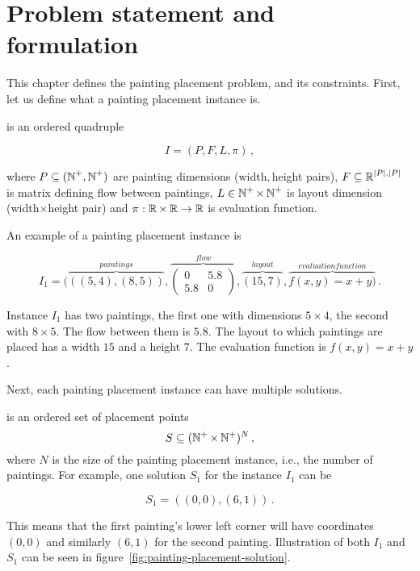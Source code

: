 \chapter{Problem statement and formulation}\label{ch:problem-statement-and-formulation}

This chapter defines the painting placement problem, and its constraints.
First, let us define what a painting placement instance is.

 is an ordered quadruple

\begin{equation}
    I = (P, F, L, \pi)\,,
    \label{eq:painting-placement-instance}
\end{equation}

where $P \subseteq (\operatorname*{\mathbb{N}}^+, \operatorname*{\mathbb{N}}^+)$ are painting dimensions (width$, $height pairs),
$F \subseteq \operatorname*{\mathbb{R}}^{|P|, |P|}$ is matrix defining flow between paintings,
$L \in \operatorname*{\mathbb{N}}^+ \times \operatorname*{\mathbb{N}}^+$ is layout dimension (width$\times$height pair)
and $\pi: \operatorname*{\mathbb{R}} \times \operatorname*{\mathbb{R}} \to \operatorname*{\mathbb{R}}$ is evaluation function.

An example of a painting placement instance is

\[
    I_1 = (\overbrace{((5,4),(8,5))}^{paintings},
    \overbrace{\begin{pmatrix}
                   0   & 5.8 \\
                   5.8 & 0
    \end{pmatrix}}^{flow},
    \overbrace{(15,7)}^{layout},
    \overbrace{f(x,y) = x+y)}^{evaluation function}\,.
\]

Instance $I_1$ has two paintings, the first one with dimensions $5\times4$, the second with $8\times5$.
The flow between them is $5.8$. The layout to which paintings are placed has a width $15$ and a height $7$.
The evaluation function is $f(x,y) = x+y$.

Next, each painting placement instance can have multiple solutions.

 is an ordered set of placement points
\begin{equation}
    S \subseteq (\operatorname*{\mathbb{N}^+} \times \operatorname*{\mathbb{N}^+})^N  \,,
    \label{eq:painting-placement-solution}
\end{equation}
where $N$ is the size of the painting placement instance, i.e., the number of paintings.
For example, one solution $S_1$ for the instance $I_1$ can be

\[
    S_1 = ((0,0), (6,1)) \,.
\]

This means that the first painting's lower left corner will have coordinates $(0,0)$
and similarly $(6,1)$ for the second painting.
Illustration of both $I_1$ and $S_1$ can be seen in figure~\ref{fig:painting-placement-solution}.

